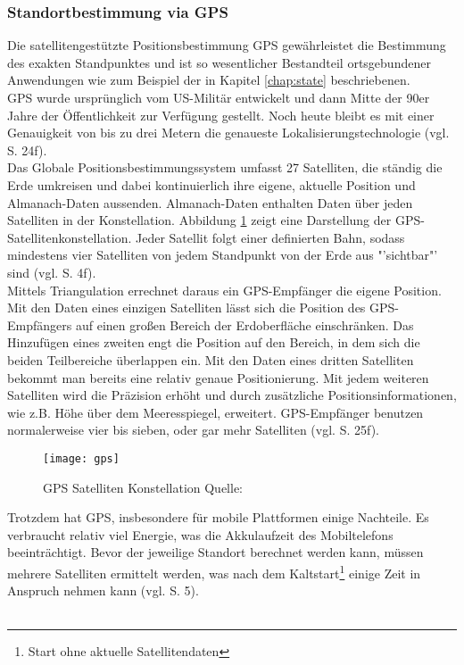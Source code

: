 \subsubsection{Standortbestimmung via \gls{GPS}}
Die satellitengestützte Positionsbestimmung \gls{GPS} gewährleistet die Bestimmung des exakten Standpunktes und ist so wesentlicher Bestandteil ortsgebundener Anwendungen wie zum Beispiel der in Kapitel \ref{chap:state} beschriebenen. \\
\gls{GPS} wurde ursprünglich vom US-Militär entwickelt und dann Mitte der 90er Jahre der Öffentlichkeit zur Verfügung gestellt. Noch heute bleibt es mit einer Genauigkeit von bis zu drei Metern die genaueste Lokalisierungstechnologie (vgl. \cite{gps} S. 24f).\\
Das Globale Positionsbestimmungssystem umfasst 27 Satelliten, die ständig die Erde umkreisen und dabei kontinuierlich ihre eigene, aktuelle Position und Almanach-Daten aussenden. Almanach-Daten enthalten Daten über jeden Satelliten in der Konstellation. Abbildung \ref{fig:gps} zeigt eine Darstellung der GPS-Satellitenkonstellation. Jeder Satellit folgt einer definierten Bahn, sodass mindestens vier Satelliten von jedem Standpunkt von der Erde aus "'sichtbar"' sind (vgl. \cite{location} S. 4f).\\
Mittels Triangulation errechnet daraus ein \gls{GPS}-Empfänger die eigene Position. Mit den Daten eines einzigen Satelliten lässt sich die Position des \gls{GPS}-Empfängers auf einen großen Bereich der Erdoberfläche einschränken. Das Hinzufügen eines zweiten engt die Position auf den Bereich, in dem sich die beiden Teilbereiche überlappen ein. Mit den Daten eines dritten Satelliten bekommt man bereits eine relativ genaue Positionierung. Mit jedem weiteren Satelliten wird die Präzision erhöht und durch zusätzliche Positionsinformationen, wie z.B. Höhe über dem Meeresspiegel, erweitert. \gls{GPS}-Empfänger benutzen normalerweise vier bis sieben, oder gar mehr Satelliten (vgl. \cite{gps} S. 25f).\\
\begin{figure}[H]  
    \centering  
    \texttt{[image: gps]} 
    \grayRule
    \caption[GPS Satelliten Konstellation]{GPS Satelliten Konstellation  Quelle: \cite{fig:gps}}
    \label{fig:gps}
\end{figure}
Trotzdem hat \gls{GPS}, insbesondere für mobile Plattformen einige Nachteile. Es verbraucht relativ viel Energie, was die Akkulaufzeit des Mobiltelefons beeinträchtigt. Bevor der jeweilige Standort berechnet werden kann, müssen mehrere Satelliten ermittelt werden, was nach dem Kaltstart\footnote{ Start ohne aktuelle Satellitendaten} einige Zeit in Anspruch nehmen kann (vgl. \cite{location} S. 5).\\\\
